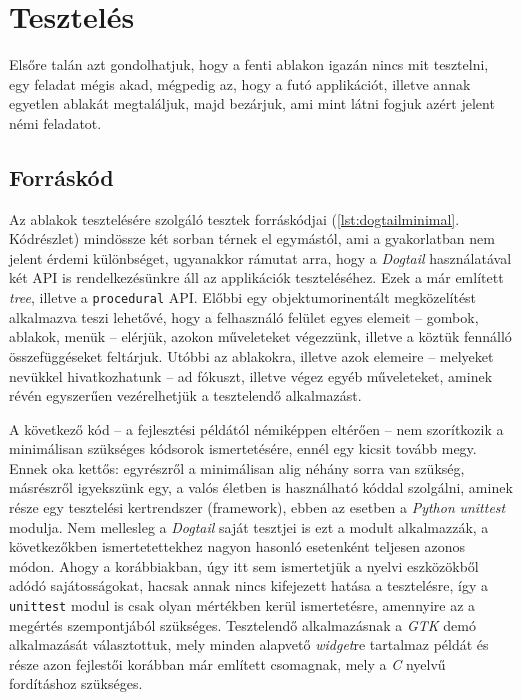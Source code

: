 \section{Tesztelés}

Elsőre talán azt gondolhatjuk, hogy a fenti ablakon igazán nincs mit tesztelni, egy feladat mégis akad, mégpedig az, hogy a futó applikációt, illetve annak egyetlen ablakát megtaláljuk, majd bezárjuk, ami mint látni fogjuk azért jelent némi feladatot.

\subsection{Forráskód}

Az ablakok tesztelésére szolgáló tesztek forráskódjai (\ref{lst:dogtailminimal}. Kódrészlet) mindössze két sorban térnek el egymástól, ami a gyakorlatban nem jelent érdemi különbséget, ugyanakkor rámutat arra, hogy a \textit{Dogtail} használatával két API is rendelkezésünkre áll az applikációk teszteléséhez. Ezek a már említett \textit{tree}, illetve a \texttt{procedural} API. Előbbi egy objektumorinentált megközelítést alkalmazva teszi lehetővé, hogy a felhasználó felület egyes elemeit -- gombok, ablakok, menük -- elérjük, azokon műveleteket végezzünk, illetve a köztük fennálló összefüggéseket feltárjuk. Utóbbi az ablakokra, illetve azok elemeire -- melyeket nevükkel hivatkozhatunk -- ad fókuszt, illetve végez egyéb műveleteket, aminek révén egyszerűen vezérelhetjük a tesztelendő alkalmazást.

A következő kód -- a fejlesztési példától némiképpen eltérően -- nem szorítkozik a minimálisan szükséges kódsorok ismertetésére, ennél egy kicsit tovább megy. Ennek oka kettős: egyrészről a minimálisan alig néhány sorra van szükség, másrészről igyekszünk egy, a valós életben is használható kóddal szolgálni, aminek része egy tesztelési kertrendszer (framework), ebben az esetben a \textit{Python} \textit{unittest} modulja. Nem mellesleg a \textit{Dogtail} saját tesztjei is ezt a modult alkalmazzák, a következőkben ismertetettekhez nagyon hasonló esetenként teljesen azonos módon. Ahogy a korábbiakban, úgy itt sem ismertetjük a nyelvi eszközökből adódó sajátosságokat, hacsak annak nincs kifejezett hatása a tesztelésre, így a \texttt{unittest} modul is csak olyan mértékben kerül ismertetésre, amennyire az a megértés szempontjából szükséges. Tesztelendő alkalmazásnak a \textit{GTK} demó alkalmazását választottuk, mely minden alapvető \textit{widget}re tartalmaz példát és része azon fejlestői korábban már említett csomagnak, mely a \textit{C} nyelvű fordításhoz szükséges.

